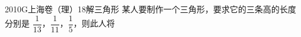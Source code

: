 
\begin{problem}{2010}{G}{上海卷（理）}{18}{解三角形}
某人要制作一个三角形，要求它的三条高的长度分别是 $\dfrac{1}{13}$，$\dfrac{1}{11}$，$\dfrac{1}{5}$，则此人将

\begin{choices}
\end{choices}
\end{problem}